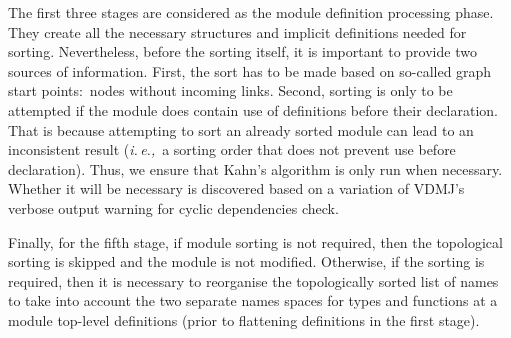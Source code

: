 \documentclass[runningheads,a4paper]{llncs}
\newcommand{\ie}{{\em i.\,e.,\/}}
\begin{document}
The first three stages are considered as the module definition processing phase. They create all the necessary structures and implicit definitions needed for sorting. Nevertheless, before the sorting itself, it is important to provide two sources of information. First, the sort has to be made based on so-called graph start points:~nodes without incoming links. Second, sorting is only to be attempted if the module does contain use of definitions before their declaration. That is because attempting to sort an already sorted module can lead to an inconsistent result (\ie~a sorting order that does not prevent use before declaration). Thus, we ensure that Kahn's algorithm is only run when necessary. Whether it will be necessary is discovered based on a variation of VDMJ's verbose output warning for cyclic dependencies check.

Finally, for the fifth stage, if module sorting is not required, then the topological sorting is skipped and the module is not modified. Otherwise, if the sorting is required, then it is necessary to reorganise the topologically sorted list of names to take into account the two separate names spaces for types and functions at a module top-level definitions (prior to flattening definitions in the first stage). 
\end{document}
